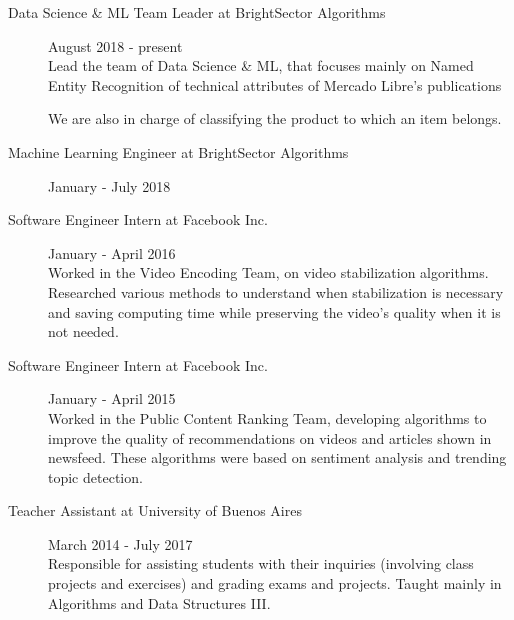\documentclass [a4paper, 11pt]{article}
\begin{document}
\begin{description}
  \item[Data Science \& ML Team Leader at BrightSector Algorithms] {\hfill August 2018 - present\\
    Lead the team of Data Science \& ML, that focuses mainly on Named Entity Recognition of technical 
    attributes of Mercado Libre's publications
    
    We are also in charge of classifying the product to which an item belongs.
  }

  \item[Machine Learning Engineer at BrightSector Algorithms] {\hfill January - July 2018\\
  }
  \item[Software Engineer Intern at Facebook Inc.] {\hfill January - April 2016\\
  Worked in the Video Encoding Team, on video stabilization algorithms. Researched various methods to 
  understand when stabilization is necessary and saving computing time while preserving the video's quality when it is not needed. 

}

  \item[Software Engineer Intern at Facebook Inc.] {\hfill January - April 2015\\
Worked in the Public Content Ranking Team, developing algorithms to improve the quality of recommendations on videos and articles shown in newsfeed. These algorithms were based on sentiment analysis and trending topic detection. %
}

  \item[Teacher Assistant at University of Buenos Aires] {\hfill March 2014 - July 2017\\
  Responsible for assisting students with their inquiries (involving class projects and 
  exercises) and grading exams and projects. Taught mainly in Algorithms 
  and Data Structures III.
}


\end{description}
\end{document}
